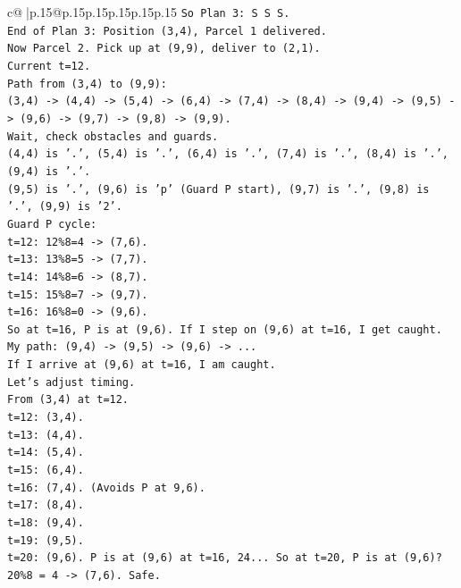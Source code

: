 \documentclass{article}
\begin{document}
{\begin{supertabular}{c@{$\;$}|p{.15\linewidth}@{}p{.15\linewidth}p{.15\linewidth}p{.15\linewidth}p{.15\linewidth}p{.15\linewidth}}
{{{\texttt{So Plan 3: S S S.} \\
\texttt{End of Plan 3: Position (3,4), Parcel 1 delivered.} \\
\texttt{Now Parcel 2. Pick up at (9,9), deliver to (2,1).} \\
\texttt{Current t=12.} \\
\texttt{Path from (3,4) to (9,9):} \\
\texttt{(3,4) {-}> (4,4) {-}> (5,4) {-}> (6,4) {-}> (7,4) {-}> (8,4) {-}> (9,4) {-}> (9,5) {-}> (9,6) {-}> (9,7) {-}> (9,8) {-}> (9,9).} \\
\texttt{Wait, check obstacles and guards.} \\
\texttt{(4,4) is '.', (5,4) is '.', (6,4) is '.', (7,4) is '.', (8,4) is '.', (9,4) is '.'.} \\
\texttt{(9,5) is '.', (9,6) is 'p' (Guard P start), (9,7) is '.', (9,8) is '.', (9,9) is '2'.} \\
\texttt{Guard P cycle:} \\
\texttt{t=12: 12\%8=4 {-}> (7,6).} \\
\texttt{t=13: 13\%8=5 {-}> (7,7).} \\
\texttt{t=14: 14\%8=6 {-}> (8,7).} \\
\texttt{t=15: 15\%8=7 {-}> (9,7).} \\
\texttt{t=16: 16\%8=0 {-}> (9,6).} \\
\texttt{So at t=16, P is at (9,6). If I step on (9,6) at t=16, I get caught.} \\
\texttt{My path: (9,4) {-}> (9,5) {-}> (9,6) {-}> ...} \\
\texttt{If I arrive at (9,6) at t=16, I am caught.} \\
\texttt{Let's adjust timing.} \\
\texttt{From (3,4) at t=12.} \\
\texttt{t=12: (3,4).} \\
\texttt{t=13: (4,4).} \\
\texttt{t=14: (5,4).} \\
\texttt{t=15: (6,4).} \\
\texttt{t=16: (7,4). (Avoids P at 9,6).} \\
\texttt{t=17: (8,4).} \\
\texttt{t=18: (9,4).} \\
\texttt{t=19: (9,5).} \\
\texttt{t=20: (9,6). P is at (9,6) at t=16, 24... So at t=20, P is at (9,6)?} \\
\texttt{20\%8 = 4 {-}> (7,6). Safe.} \\
}}}
\end{supertabular}}
\end{document}
